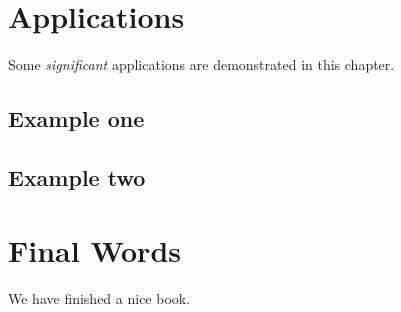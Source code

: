 \documentclass[
]{book}
\begin{document}
\hypertarget{applications}{%
\chapter{Applications}\label{applications}}

Some \emph{significant} applications are demonstrated in this chapter.

\hypertarget{example-one}{%
\section{Example one}\label{example-one}}

\hypertarget{example-two}{%
\section{Example two}\label{example-two}}

\hypertarget{final-words}{%
\chapter{Final Words}\label{final-words}}

We have finished a nice book.

  
\end{document}

